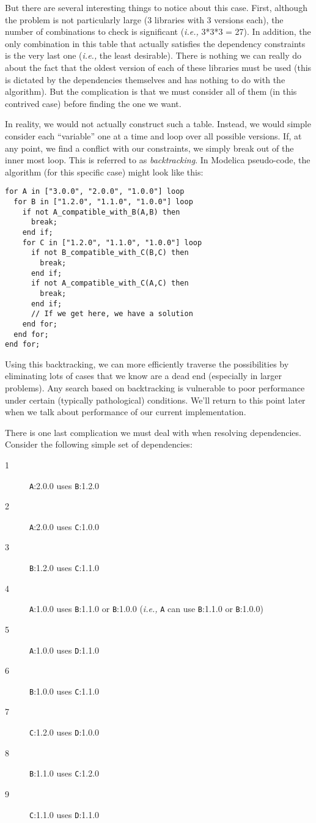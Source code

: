 \documentclass[11pt,a4paper,twocolumn]{article}
\newcommand{\code}[1]{\texttt{#1}} %
\begin{document}
But there are several interesting things to notice about this case.
First, although the problem is not particularly large (3 libraries
with 3 versions each), the number of combinations to check is
significant ({\it i.e.,} 3*3*3 = 27).  In addition, the only
combination in this table that actually satisfies the dependency
constraints is the very last one ({\it i.e.,} the least desirable).
There is nothing we can really do about the fact that the oldest
version of each of these libraries must be used (this is dictated by
the dependencies themselves and has nothing to do with the algorithm).
But the complication is that we must consider all of them (in this
contrived case) before finding the one we want.

In reality, we would not actually construct such a table.  Instead, we
would simple consider each ``variable'' one at a time and loop over
all possible versions.  If, at any point, we find a conflict with our
constraints, we simply break out of the inner most loop.  This is
referred to as {\em backtracking}.  In Modelica pseudo-code, the
algorithm (for this specific case) might look like this:

\begin{verbatim}
for A in ["3.0.0", "2.0.0", "1.0.0"] loop
  for B in ["1.2.0", "1.1.0", "1.0.0"] loop
    if not A_compatible_with_B(A,B) then
      break;
    end if;
    for C in ["1.2.0", "1.1.0", "1.0.0"] loop
      if not B_compatible_with_C(B,C) then
        break;
      end if;
      if not A_compatible_with_C(A,C) then
        break;
      end if;
      // If we get here, we have a solution
    end for;
  end for;
end for;
\end{verbatim}

Using this backtracking, we can more efficiently traverse the
possibilities by eliminating lots of cases that we know are a dead
end (especially in larger problems).  Any search based on backtracking
is vulnerable to poor performance under certain (typically
pathological) conditions.  We'll return to this point later when we
talk about performance of our current implementation.

There is one last complication we must deal with when resolving
dependencies.  Consider the following simple set of dependencies:

\begin{description}
  \item[1] {\code A:2.0.0} uses {\code B:1.2.0}
  \item[2] {\code A:2.0.0} uses {\code C:1.0.0}
  \item[3] {\code B:1.2.0} uses {\code C:1.1.0}
  \item[4] {\code A:1.0.0} uses {\code B:1.1.0} or {\code B:1.0.0} ({\it i.e.,} {\code A}
    can use {\code B:1.1.0} or {\code B:1.0.0})
  \item[5] {\code A:1.0.0} uses {\code D:1.1.0}
  \item[6] {\code B:1.0.0} uses {\code C:1.1.0}
  \item[7] {\code C:1.2.0} uses {\code D:1.0.0}
  \item[8] {\code B:1.1.0} uses {\code C:1.2.0}
  \item[9] {\code C:1.1.0} uses {\code D:1.1.0}
\end{description}
\end{document}

